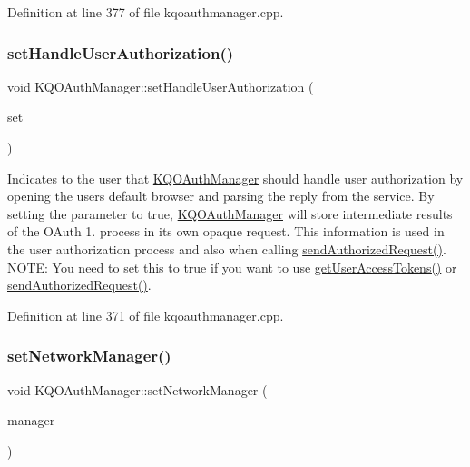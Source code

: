 Definition at line 377 of file kqoauthmanager.\+cpp.

\mbox{\label{class_k_q_o_auth_manager_a55409df469317596b81ab50823eb6a97}} 
\subsubsection{\texorpdfstring{set\+Handle\+User\+Authorization()}{setHandleUserAuthorization()}}
{\footnotesize\ttfamily void K\+Q\+O\+Auth\+Manager\+::set\+Handle\+User\+Authorization (\begin{DoxyParamCaption}\item[{bool}]{set }\end{DoxyParamCaption})}

Indicates to the user that \hyperlink{class_k_q_o_auth_manager}{K\+Q\+O\+Auth\+Manager} should handle user authorization by opening the user\textquotesingle{}s default browser and parsing the reply from the service. By setting the parameter to true, \hyperlink{class_k_q_o_auth_manager}{K\+Q\+O\+Auth\+Manager} will store intermediate results of the O\+Auth 1. process in its own opaque request. This information is used in the user authorization process and also when calling \hyperlink{class_k_q_o_auth_manager_ab605e437fb159d0a20e2e92601d679fe}{send\+Authorized\+Request()}. N\+O\+TE\+: You need to set this to true if you want to use \hyperlink{class_k_q_o_auth_manager_a657d5a05c680ed6c53199e9de59f2e1c}{get\+User\+Access\+Tokens()} or \hyperlink{class_k_q_o_auth_manager_ab605e437fb159d0a20e2e92601d679fe}{send\+Authorized\+Request()}. 

Definition at line 371 of file kqoauthmanager.\+cpp.

\mbox{\label{class_k_q_o_auth_manager_a4cc730a5e030d461c889cd844b6b9e40}} 
\subsubsection{\texorpdfstring{set\+Network\+Manager()}{setNetworkManager()}}
{\footnotesize\ttfamily void K\+Q\+O\+Auth\+Manager\+::set\+Network\+Manager (\begin{DoxyParamCaption}\item[{Q\+Network\+Access\+Manager $\ast$}]{manager }\end{DoxyParamCaption})}

